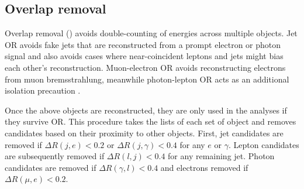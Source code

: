 \subsection{Overlap removal}

\begin{sloppypar}
Overlap removal () avoids double-counting of energies across
multiple objects. Jet
\ac{OR} avoids fake jets that are reconstructed from a prompt electron or photon
signal and also avoids cases where near-coincident leptons and jets might bias
each other's reconstruction. Muon-electron \ac{OR} avoids reconstructing
electrons from muon bremsstrahlung, meanwhile photon-lepton \ac{OR} acts as an
additional isolation precaution \cite{Adams2015}.
\end{sloppypar}

Once the above objects are reconstructed, they are only used in the analyses if
they survive \ac{OR}. This procedure takes the lists of each set of
object and removes candidates based on their proximity to other objects.
%
First, jet candidates are removed if $\Delta R(j,e) < 0.2$ or $\Delta
R(j,\gamma) < 0.4$ for any $e$ or $\gamma$. Lepton candidates are subsequently
removed if $\Delta R(l,j) < 0.4$ for any remaining jet. Photon candidates are
removed if $\Delta R(\gamma,l) < 0.4$ and electrons removed if $\Delta R(\mu,e)
< 0.2$.

